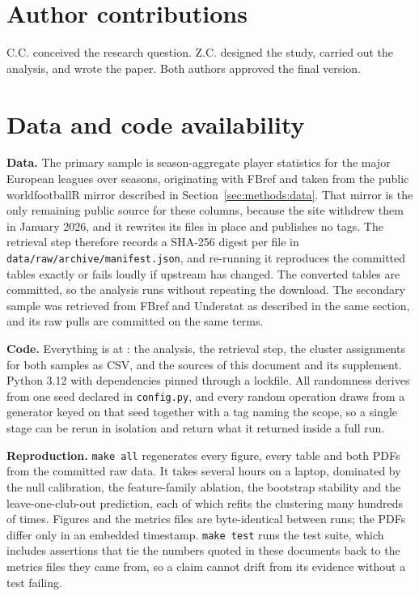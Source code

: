 \ifreview\else
\section*{Author contributions}

C.C. conceived the research question. Z.C. designed the study, carried out the analysis,
and wrote the paper. Both authors approved the final version.
\fi

\section*{Data and code availability}

\textbf{Data.} The primary sample is season-aggregate player statistics for the
\ArcNLeaguesWord{} major European leagues over \ArcNSeasonsWord{} seasons, originating with
FBref and taken from the public worldfootballR mirror described in
Section~\ref{sec:methods:data}. That mirror is the only remaining public source for these
columns, because the site withdrew them in January 2026, and it rewrites its files in place
and publishes no tags. The retrieval step therefore records a SHA-256 digest per file in
\texttt{data/raw/archive/manifest.json}, and re-running it reproduces the committed tables
exactly or fails loudly if upstream has changed. The converted tables are committed, so the
analysis runs without repeating the download. The secondary sample was retrieved from FBref
and Understat as described in the same section, and its raw pulls are committed on the same
terms.

\textbf{Code.} Everything is at \repourl{}: the analysis, the retrieval step, the cluster
assignments for both samples as CSV, and the sources of this document and its supplement.
Python 3.12 with dependencies pinned through a lockfile. All randomness derives from one
seed declared in \texttt{config.py}, and every random operation draws from a generator keyed
on that seed together with a tag naming the scope, so a single stage can be rerun in
isolation and return what it returned inside a full run.

\textbf{Reproduction.} \texttt{make all} regenerates every figure, every table and both PDFs
from the committed raw data. It takes several hours on a laptop, dominated by the null
calibration, the feature-family ablation, the bootstrap stability and the leave-one-club-out
prediction, each of which refits the clustering many hundreds of times. Figures and the
metrics files are byte-identical between runs; the PDFs differ only in an embedded
timestamp. \texttt{make test} runs the test suite, which includes assertions that tie the
numbers quoted in these documents back to the metrics files they came from, so a claim
cannot drift from its evidence without a test failing.

